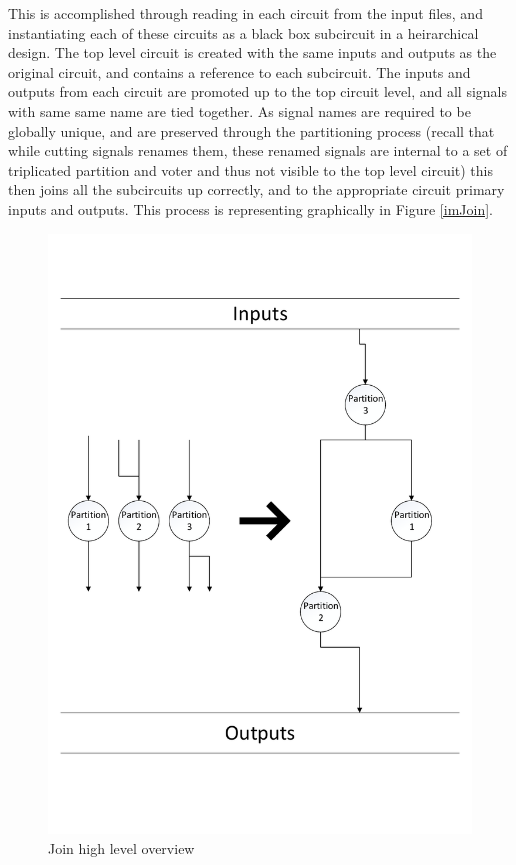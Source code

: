 \documentclass[12pt,final,oneside]{dwThesis} %
\begin{document}
   This is accomplished through reading in each circuit from the input files, and instantiating each of these circuits as a black box subcircuit in a heirarchical design.
   The top level circuit is created with the same inputs and outputs as the original circuit, and contains a reference to each subcircuit.
   The inputs and outputs from each circuit are promoted up to the top circuit level, and all signals with same same name are tied together.
   As signal names are required to be globally unique, and are preserved through the partitioning process (recall that while cutting signals renames them, these renamed signals are internal to a set of triplicated partition and voter and thus not visible to the top level circuit) this then joins all the subcircuits up correctly, and to the appropriate circuit primary inputs and outputs.
   This process is representing graphically in Figure \ref{imJoin}.
   \begin{figure}

      \begin{center}

         \includegraphics[width=\linewidth]{images/merge.pdf} \caption{Join high level overview}
         \label{imMerge} 
      \end{center}

   \end{figure}
\end{document}
